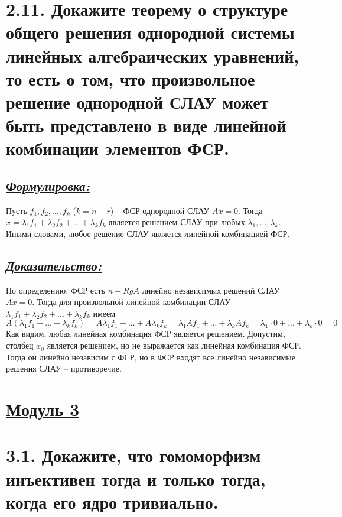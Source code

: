 \documentclass{article}
\begin{document}
\section*{\LARGE 2.11. Докажите теорему о структуре общего решения однородной системы линейных алгебраических уравнений, то есть о том, что произвольное решение однородной СЛАУ может быть представлено в виде линейной комбинации элементов ФСР.}
\subsection*{\Large \underline{\textit{Формулировка: }}}
Пусть $f_1, f_2, ..., f_k$ ($k = n - r$) -- ФСР однородной СЛАУ $Ax = 0$. Тогда $x = \lambda_1f_1 + \lambda_2f_2 + ... + \lambda_kf_k$ является решением СЛАУ при любых $\lambda_1, ..., \lambda_k$. Иными словами, любое решение СЛАУ является линейной комбинацией ФСР.

\subsection*{\Large \underline{\textit{Доказательство: }}}
По определению, ФСР есть $n - RgA$ линейно независимых решений СЛАУ $Ax = 0$. Тогда для произвольной линейной комбинации СЛАУ $\lambda_1f_1 + \lambda_2f_2 + ... + \lambda_kf_k$ имеем 
$$
A(\lambda_1f_1 + ... + \lambda_kf_k) = A\lambda_1f_1 + ... + A\lambda_kf_k = \lambda_1Af_1 + ... + \lambda_kAf_k = \lambda_1\cdot 0 + ... + \lambda_k\cdot 0 = 0
$$
Как видим, любая линейная комбинация ФСР является решением. 
\newline Допустим, столбец $x_0$ является решением, но не выражается как линейная комбинация ФСР. Тогда он линейно независим с ФСР, но в ФСР входят все линейно независимые решения СЛАУ -- противоречие.

\newpage
{}
\section*{\LARGE\centering \underline{Модуль 3}}

\section*{\LARGE 3.1. Докажите, что гомоморфизм инъективен тогда и только тогда, когда его ядро тривиально. }
\end{document}
